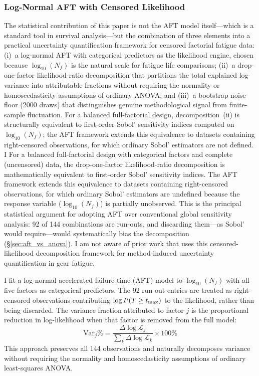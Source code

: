 \documentclass[12pt,a4paper]{article}
\begin{document}
\subsubsection{Log-Normal AFT with Censored Likelihood}

The statistical contribution of this paper is not the AFT model
itself---which is a standard tool in survival analysis---but the
combination of three elements into a practical uncertainty
quantification framework for censored factorial fatigue data:
(i)~a log-normal AFT with categorical predictors as the likelihood
engine, chosen because $\log_{10}(N_f)$ is the natural scale for
fatigue life comparisons; (ii)~a drop-one-factor likelihood-ratio
decomposition that partitions the total explained log-variance into
attributable fractions without requiring the normality or
homoscedasticity assumptions of ordinary ANOVA; and (iii)~a bootstrap
noise floor (2000 draws) that distinguishes genuine methodological
signal from finite-sample fluctuation. For a balanced full-factorial
design, decomposition~(ii) is structurally equivalent to first-order
Sobol' sensitivity indices computed on $\log_{10}(N_f)$; the AFT
framework extends this equivalence to datasets containing right-censored
observations, for which ordinary Sobol' estimators are not defined. I
For a balanced full-factorial design with categorical factors and
complete (uncensored) data, the drop-one-factor likelihood-ratio
decomposition is mathematically equivalent to first-order Sobol'
sensitivity indices. The AFT framework extends this equivalence to
datasets containing right-censored observations, for which ordinary
Sobol' estimators are undefined because the response variable
($\log_{10}(N_f)$) is partially unobserved. This is the principal
statistical argument for adopting AFT over conventional global
sensitivity analysis: 92 of 144 combinations are run-outs, and
discarding them---as Sobol' would require---would systematically bias
the decomposition (\S\ref{sec:aft_vs_anova}). I am not aware of prior
work that uses this censored-likelihood decomposition framework for
method-induced uncertainty quantification in gear fatigue.

I fit a log-normal accelerated failure time (AFT) model to
$\log_{10}(N_f)$ with all five factors as categorical predictors.
The 92 run-out entries are treated as right-censored observations
contributing $\log P(T \geq t_{\rm max})$ to the likelihood, rather
than being discarded. The variance fraction attributed to factor
$j$ is the proportional reduction in log-likelihood when that factor
is removed from the full model:
\begin{equation}
\text{Var}_j\% =
\frac{\Delta\log\mathcal{L}_j}{\sum_k \Delta\log\mathcal{L}_k}
\times 100\%
\label{eq:lr_var}
\end{equation}
This approach
preserves all 144 observations and naturally decomposes variance
without requiring the normality and homoscedasticity assumptions of
ordinary least-squares ANOVA.
\end{document}
